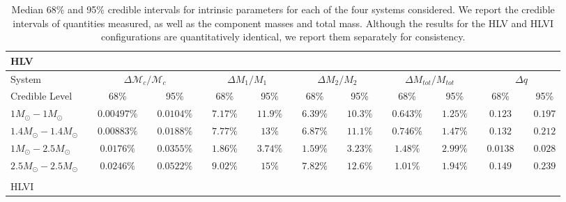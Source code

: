 \documentclass[11pt,a4paper]{emulateapj} 
\newcommand{\chmass}{\mathcal{M}_c}
\begin{document}
\begin{table}[t!]
\centering
\caption{Median 68\% and 95\% credible intervals for intrinsic parameters for
  each of the four systems considered.  We report the credible
  intervals of quantities measured, as well as the component masses
  and total mass.  Although the results for the HLV and HLVI
  configurations are quantitatively identical, we report them
  separately for consistency.}
  \tabcolsep=0.11cm
      {\renewcommand{\arraystretch}{1.3} 
\begin{tabular}{lcccccccccccccccccccc}


\\ HLV\\

 \hline\hline System & \vline & \multicolumn{3}{c}{$\Delta \chmass / \chmass$} &
\vline & \multicolumn{3}{c}{$\Delta M_1 / M_1$} & \vline & \multicolumn{3}{c}{$\Delta M_2 / M_2$} & \vline &
\multicolumn{3}{c}{$\Delta M_{tot}/M_{tot}$} & \vline & \multicolumn{3}{c}{$\Delta q$}\\ \hline
Credible Level & \vline & 68\% & \vline & 95\% & \vline & 68\% & \vline & 95\% & \vline & 68\% & \vline & 95\% & \vline & 68\% & \vline & 95\% & \vline & 68\% & \vline & 95\% \\
\hline\hline

$1M_{\odot}-1M_{\odot}$ & \vline &$0.00497\%$ & \vline &$0.0104\%$ & \vline & $7.17\%$ & \vline &$11.9\%$ & \vline & $6.39\%$ & \vline &$10.3\%$ & \vline & $0.643\%$ & \vline &$1.25\%$ & \vline & $0.123$ & \vline &$0.197$\\\hline$1.4M_{\odot}-1.4M_{\odot}$ & \vline &$0.00883\%$ & \vline &$0.0188\%$ & \vline & $7.77\%$ & \vline &$13\%$ & \vline & $6.87\%$ & \vline &$11.1\%$ & \vline & $0.746\%$ & \vline &$1.47\%$ & \vline & $0.132$ & \vline &$0.212$\\\hline$1M_{\odot}-2.5M_{\odot}$ & \vline &$0.0176\%$ & \vline &$0.0355\%$ & \vline & $1.86\%$ & \vline &$3.74\%$ & \vline & $1.59\%$ & \vline &$3.23\%$ & \vline & $1.48\%$ & \vline &$2.99\%$ & \vline & $0.0138$ & \vline &$0.028$\\\hline$2.5M_{\odot}-2.5M_{\odot}$ & \vline &$0.0246\%$ & \vline &$0.0522\%$ & \vline & $9.02\%$ & \vline &$15\%$ & \vline & $7.82\%$ & \vline &$12.6\%$ & \vline & $1.01\%$ & \vline &$1.94\%$ & \vline & $0.149$ & \vline &$0.239$\\

\hline
\hline

\\HLVI\\


\end{tabular}}
\end{table}
\end{document}
